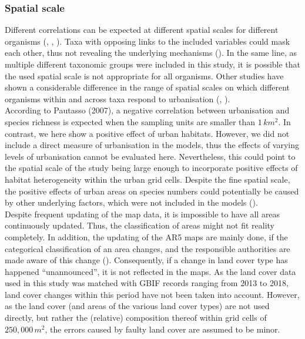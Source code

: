 \documentclass{article}
\begin{document}
\subsubsection{Spatial scale}
Different correlations can be expected at different spatial scales for different organisms (\cite{Gaston2000}, \cite{Pautasso2007}, \cite{Concepcion2016}). Taxa with opposing links to the included variables could mask each other, thus not revealing the underlying mechanisms (\cite{Beninde2015}). In the same line, as multiple different taxonomic groups were included in this study, it is possible that the used spatial scale is not appropriate for all organisms. Other studies have shown a considerable difference in the range of spatial scales on which different organisms within and across taxa respond to urbanisation (\cite{Tews2004}, \cite{Concepcion2015}).\\
According to Pautasso (2007), a negative correlation between urbanisation and species richness is expected when the sampling units are smaller than $1\,km^2$. In contrast, we here show a positive effect of urban habitats.
However, we did not include a direct measure of urbanisation in the models, thus the effects of varying levels of urbanisation cannot be evaluated here. Nevertheless, this could point to the spatial scale of the study being large enough to incorporate positive effects of habitat heterogeneity within the urban grid cells. Despite the fine spatial scale, the positive effects of urban areas on species numbers could potentially be caused by other underlying factors, which were not included in the models (\cite{Araujo2003}).\\

Despite frequent updating of the map data, it is impossible to have all areas continuously updated. Thus, the classification of areas might not fit reality completely. In addition, the updating of the AR5 maps are mainly done, if the categorical classification of an area changes, and the responsible authorities are made aware of this change (\cite{AR5}). Consequently, if a change in land cover type has happened ``unannounced'', it is not reflected in the maps. As the land cover data used in this study was matched with GBIF records ranging from 2013 to 2018, land cover changes within this period have not been taken into account. However, as the land cover (and areas of the various land cover types) are not used directly, but rather the (relative) composition thereof within grid cells of $250,000\, m^2$, the errors caused by  faulty land cover are assumed to be minor.\\ %
\end{document}
